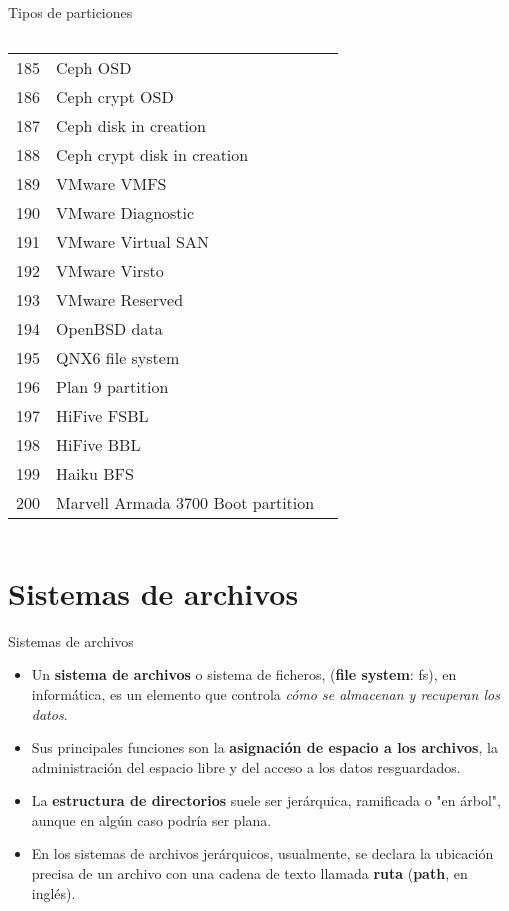 \begin{frame}[c]{Tipos de particiones}
{\begin{columns}
\begin{table}[]
\begin{tabular}{rll}
185&Ceph OSD                      \\
186&Ceph crypt OSD                \\
187&Ceph disk in creation         \\
188&Ceph crypt disk in creation    \\
189&VMware VMFS                    \\
190&VMware Diagnostic              \\
191&VMware Virtual SAN             \\
192&VMware Virsto                  \\
193&VMware Reserved                \\
194&OpenBSD data                   \\
195&QNX6 file system               \\
196&Plan 9 partition               \\
197&HiFive FSBL                    \\
198&HiFive BBL                     \\
199&Haiku BFS                      \\
200&Marvell Armada 3700 Boot partition \\
  \end{tabular}
  \end{table}
  \end{columns}
}
\end{frame}

\section{Sistemas de archivos}

\begin{frame}[c]{Sistemas de archivos}
  \begin{itemize}
    \item Un \textbf{sistema de archivos} o sistema de ficheros, (\textbf{file
          system}: fs), en informática, es un elemento que controla
          \emph{cómo se almacenan y recuperan los datos}.
    \pausa
    \item Sus principales funciones son la \textbf{asignación de espacio a los
          archivos}, la administración del espacio libre y del acceso a los
          datos resguardados.
    \pausa
    \item La \textbf{estructura de directorios} suele ser jerárquica,
      ramificada o "en árbol", aunque en algún caso podría ser plana. 
    \pausa
    \item En los sistemas de archivos jerárquicos, usualmente,
      se declara la ubicación precisa de un archivo con una cadena de texto
      llamada \textbf{ruta} (\textbf{path}, en inglés). 
  \end{itemize}
\end{frame}

